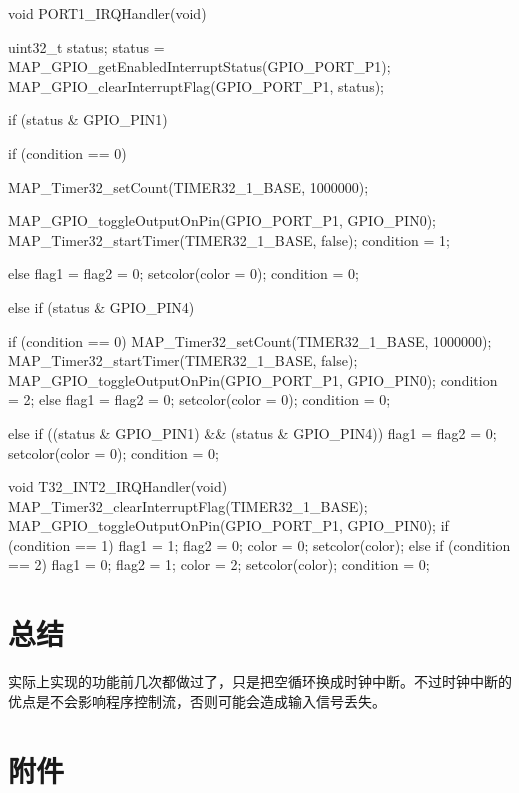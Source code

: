 \documentclass[a4paper,10pt,UTF8]{paper}
\numberwithin{equation}{section}
\numberwithin{figure}{section}
\begin{document}
\begin{ccode}
    void PORT1_IRQHandler(void)
    {
        uint32_t status;
        status = MAP_GPIO_getEnabledInterruptStatus(GPIO_PORT_P1);
        MAP_GPIO_clearInterruptFlag(GPIO_PORT_P1, status);

        if (status & GPIO_PIN1)
        {
            if (condition == 0)
            {
                MAP_Timer32_setCount(TIMER32_1_BASE, 1000000);

                MAP_GPIO_toggleOutputOnPin(GPIO_PORT_P1, GPIO_PIN0);
                MAP_Timer32_startTimer(TIMER32_1_BASE, false);
                condition = 1;
            }
            else
            {
                flag1 = flag2 = 0;
                setcolor(color = 0);
                condition = 0;
            }
        }
        else if (status & GPIO_PIN4)
        {

            if (condition == 0)
            {
                MAP_Timer32_setCount(TIMER32_1_BASE, 1000000);
                MAP_Timer32_startTimer(TIMER32_1_BASE, false);
                MAP_GPIO_toggleOutputOnPin(GPIO_PORT_P1, GPIO_PIN0);
                condition = 2;
            }
            else
            {
                flag1 = flag2 = 0;
                setcolor(color = 0);
                condition = 0;
            }
        }
        else if ((status & GPIO_PIN1) && (status & GPIO_PIN4))
        {
            flag1 = flag2 = 0;
            setcolor(color = 0);
            condition = 0;
        }
    }

    void T32_INT2_IRQHandler(void)
    {
        MAP_Timer32_clearInterruptFlag(TIMER32_1_BASE);
        MAP_GPIO_toggleOutputOnPin(GPIO_PORT_P1, GPIO_PIN0);
        if (condition == 1)
        {
            flag1 = 1;
            flag2 = 0;
            color = 0;
            setcolor(color);
        }
        else if (condition == 2)
        {
            flag1 = 0;
            flag2 = 1;
            color = 2;
            setcolor(color);
        }
        condition = 0;
    }
\end{ccode}

\section{总结}

实际上实现的功能前几次都做过了，只是把空循环换成时钟中断。不过时钟中断的优点是不会影响程序控制流，否则可能会造成输入信号丢失。

\section{附件}
\end{document}
